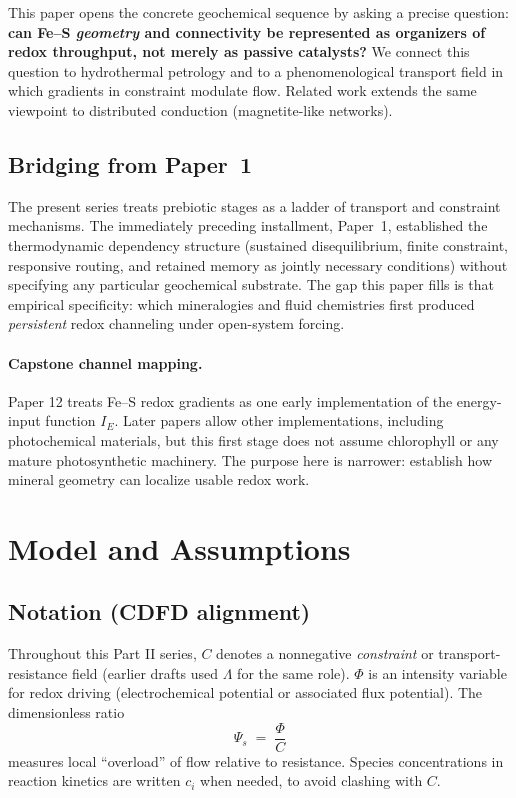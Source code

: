 \documentclass[11pt,a4paper]{article}
\begin{document}
This paper opens the concrete geochemical sequence by asking a precise question: \textbf{can Fe--S \emph{geometry} and connectivity be represented as organizers of redox throughput, not merely as passive catalysts?} We connect this question to hydrothermal petrology and to a phenomenological transport field in which gradients in constraint modulate flow. Related work extends the same viewpoint to distributed conduction (magnetite-like networks).

\subsection*{Bridging from Paper~1}
The present series treats prebiotic stages as a ladder of transport and constraint mechanisms. The immediately preceding installment, Paper~1, established the thermodynamic dependency structure (sustained disequilibrium, finite constraint, responsive routing, and retained memory as jointly necessary conditions) without specifying any particular geochemical substrate. The gap this paper fills is that empirical specificity: which mineralogies and fluid chemistries first produced \emph{persistent} redox channeling under open-system forcing.

\paragraph{Capstone channel mapping.}
Paper 12 treats Fe--S redox gradients as one early implementation of the energy-input function $I_E$. Later papers allow other implementations, including photochemical materials, but this first stage does not assume chlorophyll or any mature photosynthetic machinery. The purpose here is narrower: establish how mineral geometry can localize usable redox work.

\section{Model and Assumptions}

\subsection{Notation (CDFD alignment)}
Throughout this Part II series, $C$ denotes a nonnegative \emph{constraint} or transport-resistance field (earlier drafts used $\Lambda$ for the same role). $\Phi$ is an intensity variable for redox driving (electrochemical potential or associated flux potential). The dimensionless ratio
\begin{equation}
\Psi_s \;=\; \frac{\Phi}{C}
\end{equation}
measures local ``overload'' of flow relative to resistance. Species concentrations in reaction kinetics are written $c_i$ when needed, to avoid clashing with $C$.
\end{document}
